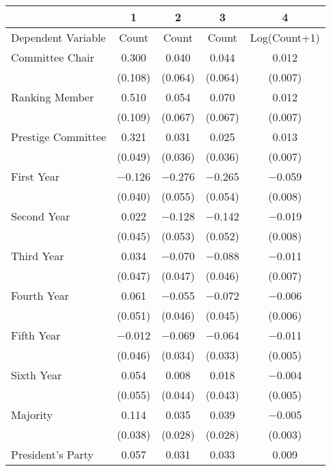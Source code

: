 \begin{table}
\centering
\begin{tabular}[t]{lcccc}
\toprule
  & 1 & 2 & 3 & 4\\
\midrule
Dependent Variable & Count & Count & Count & Log(Count+1)\\
Committee Chair & \num{0.300} & \num{0.040} & \num{0.044} & \num{0.012}\\
 & (\num{0.108}) & (\num{0.064}) & (\num{0.064}) & (\num{0.007})\\
Ranking Member & \num{0.510} & \num{0.054} & \num{0.070} & \num{0.012}\\
 & (\num{0.109}) & (\num{0.067}) & (\num{0.067}) & (\num{0.007})\\
Prestige Committee & \num{0.321} & \num{0.031} & \num{0.025} & \num{0.013}\\
 & (\num{0.049}) & (\num{0.036}) & (\num{0.036}) & (\num{0.007})\\
First Year & \num{-0.126} & \num{-0.276} & \num{-0.265} & \num{-0.059}\\
 & (\num{0.040}) & (\num{0.055}) & (\num{0.054}) & (\num{0.008})\\
Second Year & \num{0.022} & \num{-0.128} & \num{-0.142} & \num{-0.019}\\
 & (\num{0.045}) & (\num{0.053}) & (\num{0.052}) & (\num{0.008})\\
Third Year & \num{0.034} & \num{-0.070} & \num{-0.088} & \num{-0.011}\\
 & (\num{0.047}) & (\num{0.047}) & (\num{0.046}) & (\num{0.007})\\
Fourth Year & \num{0.061} & \num{-0.055} & \num{-0.072} & \num{-0.006}\\
 & (\num{0.051}) & (\num{0.046}) & (\num{0.045}) & (\num{0.006})\\
Fifth Year & \num{-0.012} & \num{-0.069} & \num{-0.064} & \num{-0.011}\\
 & (\num{0.046}) & (\num{0.034}) & (\num{0.033}) & (\num{0.005})\\
Sixth Year & \num{0.054} & \num{0.008} & \num{0.018} & \num{-0.004}\\
 & (\num{0.055}) & (\num{0.044}) & (\num{0.043}) & (\num{0.005})\\
Majority & \num{0.114} & \num{0.035} & \num{0.039} & \num{-0.005}\\
 & (\num{0.038}) & (\num{0.028}) & (\num{0.028}) & (\num{0.003})\\
President's Party & \num{0.057} & \num{0.031} & \num{0.033} & \num{0.009}\\

\end{tabular}
\end{table}
